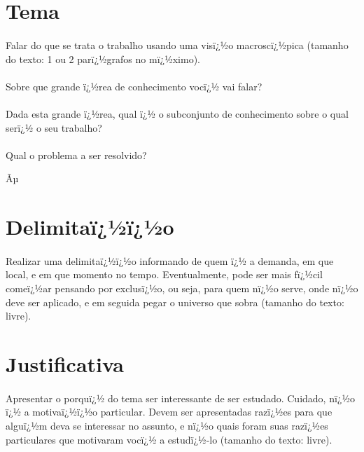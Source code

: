 \section{Tema}

\paragraph{}Falar do que se trata o trabalho usando uma visï¿½o macroscï¿½pica (tamanho do texto: 1 ou 2 parï¿½grafos no mï¿½ximo).

\paragraph{}Sobre que grande ï¿½rea de conhecimento vocï¿½ vai falar?

\paragraph{}Dada esta grande ï¿½rea, qual ï¿½ o subconjunto de conhecimento sobre o qual serï¿½ o seu trabalho?

\paragraph{}Qual o problema a ser resolvido?

Ãµ

\section{Delimitaï¿½ï¿½o}

\paragraph{}Realizar uma delimitaï¿½ï¿½o informando de quem ï¿½ a demanda, em que local, e em que momento no tempo. Eventualmente, pode ser mais fï¿½cil comeï¿½ar pensando por exclusï¿½o, ou seja, para quem nï¿½o serve, onde nï¿½o deve ser aplicado, e em seguida pegar o universo que sobra (tamanho do texto: livre).


\section{Justificativa}

\paragraph{}Apresentar o porquï¿½ do tema ser interessante de ser estudado. Cuidado, nï¿½o ï¿½ a motivaï¿½ï¿½o particular. Devem ser apresentadas razï¿½es para que alguï¿½m deva se interessar no assunto, e nï¿½o quais foram suas razï¿½es particulares que motivaram vocï¿½ a estudï¿½-lo (tamanho do texto: livre).


